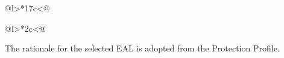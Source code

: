 \clearpage{}

\begin{longtable}[c]{@{}l>{\centering}*{17}{c}<{\centering}@{}}
  \toprule
   \\
  \midrule \endhead
  \midrule \caption{Mapping of subjects to SFR}  \endfoot
  \bottomrule \caption{Mapping of subjects to SFR} \label{tab:sfr.subjobj2sfr} \endlastfoot
\end{longtable}

\begin{longtable}[c]{@{}l>{\centering}*{2}{c}<{\centering}@{}}
  \toprule
   \\
  \midrule \endhead
  \midrule \caption{Mapping of SFR to subjects}  \endfoot
  \bottomrule \caption{Mapping of SFR to subjects} \label{tab:sfr.sfr2subjobj} \endlastfoot
\end{longtable}



The rationale for the selected EAL is adopted from the Protection Profile.

